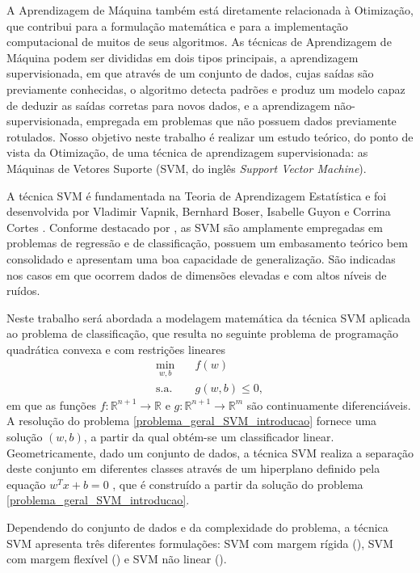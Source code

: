\documentclass[12pt,a4paper]{scrartcl}
\def\RR{\mathds{R}}
\theoremstyle{definition}%
\begin{document}
A Aprendizagem de Máquina também está diretamente relacionada à Otimização, que contribui para a formulação matemática e para a implementação computacional de muitos de seus algoritmos. As técnicas de Aprendizagem de Máquina podem ser divididas em dois tipos principais, a aprendizagem supervisionada, em que através de um conjunto de dados, cujas saídas são previamente conhecidas, o algoritmo detecta padrões e produz um modelo capaz de deduzir as saídas corretas para novos dados, e a aprendizagem não-supervisionada, empregada em problemas que não possuem dados previamente rotulados. Nosso objetivo neste trabalho é realizar um estudo teórico, do ponto de vista da Otimização, de uma técnica de aprendizagem supervisionada: as Máquinas de Vetores Suporte (SVM, do inglês \textit{Support Vector Machine}).

A técnica SVM é fundamentada na Teoria de Aprendizagem Estatística e foi desenvolvida por Vladimir Vapnik, Bernhard Boser, Isabelle Guyon e Corrina Cortes \cite{Vladimir1992,Vladimir1995}. Conforme destacado por \textcite{Evelin2017}, as SVM são amplamente empregadas em problemas de regressão e de classificação, possuem um embasamento teórico bem consolidado e apresentam uma boa capacidade de generalização. São indicadas nos casos em que ocorrem dados de dimensões elevadas e com altos níveis de ruídos. 

Neste trabalho será abordada a modelagem matemática da técnica SVM aplicada ao problema de classificação, que resulta no seguinte problema de programação quadrática convexa e com restrições lineares
\[ \label{problema_geral_SVM_introducao}
\begin{aligned}
\min_{w,b} & \quad f(w) \\
\text{s.a.} &  \quad g(w,b) \leq 0, \end{aligned}
\]
em que as funções $f:\RR^{n+1} \rightarrow \RR$ e $g:\RR^{n+1} \rightarrow \RR^{m}$ são continuamente diferenciáveis. A resolução do problema \eqref{problema_geral_SVM_introducao} fornece uma solução $(w,b)$, a partir da qual obtém-se um classificador linear. Geometricamente, dado um conjunto de dados, a técnica SVM realiza a separação deste conjunto em diferentes classes através de um hiperplano definido pela equação $w^{T}x + b = 0$ \cite{Evelin2017}, que é construído a partir da solução do problema \eqref{problema_geral_SVM_introducao}.

Dependendo do conjunto de dados e da complexidade do problema, a técnica SVM apresenta três diferentes formulações: SVM com margem rígida (), SVM com margem flexível () e SVM não linear (). 
\end{document}

